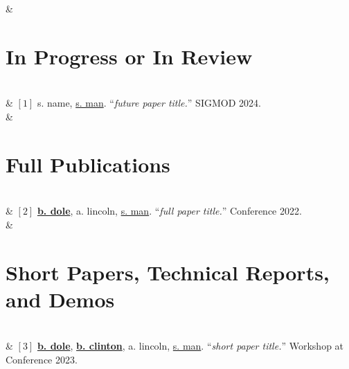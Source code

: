 


&\section{In Progress or In Review}\\
& $[1]$ \smallskip s. name, \underline{s. man}. ``{\it future paper title.}'' SIGMOD 2024. \\



&\section{Full Publications}\\
& $[2]$ \smallskip \underline{\bf b. dole}, a. lincoln, \underline{s. man}. ``{\it full paper title.}'' Conference 2022. \\



&\section{Short Papers, Technical Reports, and Demos}\\
& $[3]$ \smallskip \underline{\bf b. dole}, \underline{\bf b. clinton}, a. lincoln, \underline{s. man}. ``{\it short paper title.}'' Workshop at Conference 2023. \\
